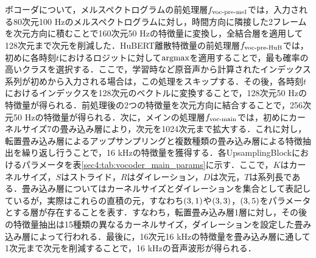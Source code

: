 ボコーダについて，メルスペクトログラムの前処理層$f_{\text{voc-pre-mel}}$では，入力される80次元100 Hzのメルスペクトログラムに対し，時間方向に隣接した2フレームを次元方向に積むことで160次元50 Hzの特徴量に変換し，全結合層を適用して128次元まで次元を削減した．HuBERT離散特徴量の前処理層$f_{\text{voc-pre-HuB}}$では，初めに各時刻$t$におけるロジットに対して$\text{argmax}$を適用することで，最も確率の高いクラスを選択する．ここで，学習時など原音声から計算されたインデックス系列が初めから入力される場合は，この処理をスキップする．その後，各時刻$t$におけるインデックスを128次元のベクトルに変換することで，128次元50 Hzの特徴量が得られる．前処理後の2つの特徴量を次元方向に結合することで，256次元50 Hzの特徴量が得られる．次に，メインの処理層$f_{\text{voc-main}}$では，初めにカーネルサイズ7の畳み込み層により，次元を1024次元まで拡大する．これに対し，転置畳み込み層によるアップサンプリングと複数種類の畳み込み層による特徴抽出を繰り返し行うことで，16 kHzの特徴量を獲得する．各UpsamplingBlockにおけるパラメータを表\ref{sec4:tab:vocoder_main_params}に示す．ここで，$K$はカーネルサイズ，$S$はストライド，$R$はダイレーション，$D$は次元，$T$は系列長である．畳み込み層についてはカーネルサイズとダイレーションを集合として表記しているが，実際はこれらの直積の元，すなわち$\left(3, 1\right)$や$\left(3, 3\right)$，$\left(3, 5\right)$をパラメータとする層が存在することを表す．すなわち，転置畳み込み層1層に対し，その後の特徴量抽出は15種類の異なるカーネルサイズ，ダイレーションを設定した畳み込み層によって行われる．最後に，16次元16 kHzの特徴量を畳み込み層に通して1次元まで次元を削減することで，16 kHzの音声波形が得られる．
